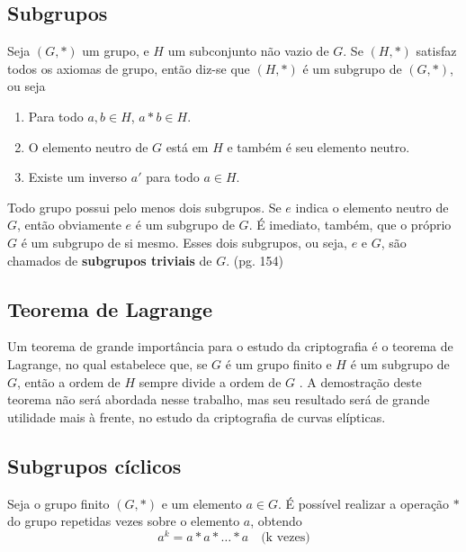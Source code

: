 %
%
\subsection{Subgrupos}
Seja $(G, *)$ um grupo, e \(H\) um subconjunto não vazio de \(G\). Se $(H, *)$ satisfaz todos os axiomas de grupo, então diz-se que $(H, *)$ é um subgrupo de $(G, *)$\cite{Coutinho:2014}, ou seja

\begin{enumerate}
\item Para todo $a, b \in H$, $a * b \in H$.
\item O elemento neutro de \(G\) está em \(H\) e também é seu elemento neutro.
\item Existe um inverso \(a'\) para todo $a \in H$.
\end{enumerate}

Todo grupo possui pelo menos dois subgrupos. Se \(e\) indica o elemento neutro de \(G\), então obviamente \(e\) é um subgrupo de \(G\). É imediato, também, que o próprio \(G\) é um subgrupo de si mesmo. Esses dois subgrupos, ou seja, \(e\) e \(G\), são chamados de \textbf{subgrupos triviais} de \(G\). \cite{Domingues:2003} (pg. 154)

%
%
\subsection{Teorema de Lagrange}
Um teorema de grande importância para o estudo da criptografia é o teorema de Lagrange, no qual estabelece que, se \(G\) é um grupo finito e \(H\) é um subgrupo de \(G\), então a ordem de \(H\) sempre divide a ordem de \(G\) \cite{Shoup:2005}. A demostração deste teorema não será abordada nesse trabalho, mas seu resultado será de grande utilidade mais à frente, no estudo da criptografia de curvas elípticas.

%
%

%
%
\subsection{Subgrupos cíclicos}
Seja o grupo finito $(G,*)$ e um elemento $a \in G$. É possível realizar a operação $*$ do grupo repetidas vezes sobre o elemento $a$, obtendo
$$
a^k = a * a * \ldots * a \quad\mbox{(k vezes)}
$$

